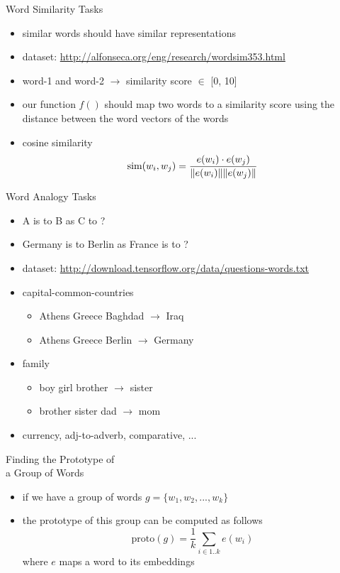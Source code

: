 \documentclass[12pt, handout]{beamer}
\begin{document}
\begin{frame}{Word Similarity Tasks}
	\begin{itemize}
		\item<1-> similar words should have similar representations
		\item<1-> dataset: \url{http://alfonseca.org/eng/research/wordsim353.html}
		\item<2->  word-1 and word-2 $\rightarrow$ similarity score $\in$ [0, 10]
		\item<3-> our function $f()$ should map two words to a similarity score using the distance between the word vectors of the words 
		\item<4-> cosine similarity
		\begin{equation*}
		\text{sim}(w_i,w_j) = \frac{e(w_i) \cdot e(w_j)}{\norm{e(w_i)} \norm{e(w_j)}}
		\end{equation*} 
	\end{itemize}
\end{frame}
\begin{frame}{Word Analogy Tasks}
	\begin{itemize}
		\item<1-> A is to B as C to ?
		\item<2-> Germany is to Berlin as France is to ?
		\item<2-> dataset:
		\url{http://download.tensorflow.org/data/questions-words.txt}
		\item<3-> capital-common-countries
		\begin{itemize}
			\item<3-> Athens Greece Baghdad  $\rightarrow$ Iraq
			\item<3-> Athens Greece Berlin  $\rightarrow$ Germany
		\end{itemize}
		\item<4-> family
		\begin{itemize}
			\item<4-> boy girl brother $\rightarrow$ sister
			\item<4-> brother sister dad $\rightarrow$ mom
		\end{itemize}
		\item<5-> currency, adj-to-adverb, comparative, ...
	\end{itemize}
\end{frame}
\begin{frame}{Finding the Prototype of  \\ a Group of Words}
	\begin{itemize}
		\item<1-> if we have a group of words $g = \{ w_1, w_2, ..., w_k \}$
		\item<2-> the prototype of this group can be computed as follows
		\begin{equation*}
		\text{proto}(g) = \frac{1}{k} \sum_{i \in 1..k} e(w_i)
		\end{equation*}
		where $e$ maps a word to its  embeddings
	\end{itemize}
\end{frame}
\end{document}
